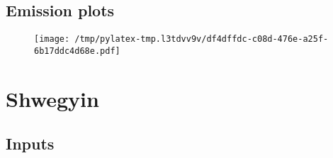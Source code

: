 \documentclass{article}%
\begin{document}
\subsection{Emission plots}%
\label{subsec:Emissionplots}%


\begin{figure}[htbp]%
\centering%
\texttt{[image: /tmp/pylatex-tmp.l3tdvv9v/df4dffdc-c08d-476e-a25f-6b17ddc4d68e.pdf]}%
\end{figure}

%
\section{Shwegyin}%
\label{sec:Shwegyin}%
\subsection{Inputs}%
\label{subsec:Inputs}%
\end{document}
